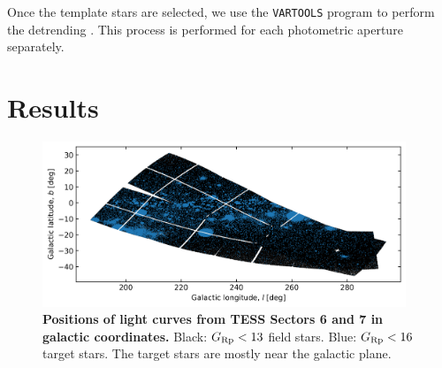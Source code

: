\documentclass[12pt,twocolumn,tighten]{aastex62}
\begin{document}
Once the template stars are selected, we use the \texttt{VARTOOLS}
program to perform the detrending \citep{Hartman_Bakos_2016}.
This process is performed for each photometric aperture
separately.


\section{Results}
\label{sec:results}

\begin{figure}[!t]
	\begin{center}
		\leavevmode
		\includegraphics[width=0.97\textwidth]{galacticcoords_cluster_field_star_positions.png}
	\end{center}
	\vspace{-0.5cm}
	\caption{
		{\bf Positions of light curves from TESS Sectors 6
			and 7 in galactic coordinates.}
		Black: $G_{\rm Rp}<13$ field stars.  Blue: $G_{\rm Rp}<16$
		target stars.  The target stars are mostly near the galactic
		plane.
		\label{fig:lcgalactic}
	}
\end{figure}

\end{document}
